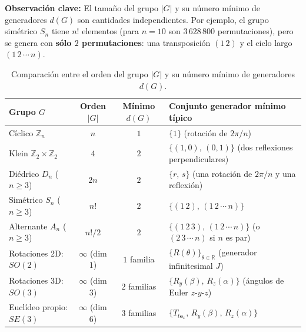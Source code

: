 \documentclass[11pt,letterpaper]{article}
\begin{document}
\textbf{Observación clave:} El tamaño del grupo $|G|$ y su número mínimo de generadores $d(G)$ son cantidades independientes. Por ejemplo, el grupo simétrico $S_n$ tiene $n!$ elementos (para $n=10$ son $3\,628\,800$ permutaciones), pero se genera con \textbf{sólo $2$ permutaciones}: una transposición $(1\,2)$ y el ciclo largo $(1\,2\,\cdots\,n)$.

\begin{table}[htbp]
\centering
\renewcommand{\arraystretch}{1.35}
\begin{tabular}{@{}lccl@{}}
  \toprule
  \textbf{Grupo $G$} & \textbf{Orden $|G|$} & \textbf{Mínimo $d(G)$} & \textbf{Conjunto generador mínimo típico} \\
  \midrule
  Cíclico $\mathbb{Z}_n$ & $n$ & $1$ & $\{1\}$ (rotación de $2\pi/n$) \\
  Klein $\mathbb{Z}_2\times\mathbb{Z}_2$ & $4$ & $2$ & $\{(1,0),\,(0,1)\}$ (dos reflexiones perpendiculares) \\
  Diédrico $D_n$ ($n\ge 3$) & $2n$ & $2$ & $\{r,\,s\}$ (una rotación de $2\pi/n$ y una reflexión) \\
  Simétrico $S_n$ ($n\ge 3$) & $n!$ & $2$ & $\{(1\,2),\,(1\,2\,\cdots\,n)\}$ \\
  Alternante $A_n$ ($n\ge 3$) & $n!/2$ & $2$ & $\{(1\,2\,3),\,(1\,2\,\cdots\,n)\}$ (o $(2\,3\,\cdots\,n)$ si $n$ es par) \\
  \midrule
  Rotaciones 2D: $SO(2)$ & $\infty$ (dim $1$) & $1$ familia & $\{R(\theta)\}_{\theta\in\mathbb{R}}$ \quad (generador infinitesimal $J$) \\
  Rotaciones 3D: $SO(3)$ & $\infty$ (dim $3$) & $2$ familias & $\{R_y(\beta),\,R_z(\alpha)\}$ \quad (ángulos de Euler $z$-$y$-$z$) \\
  Euclídeo propio: $SE(3)$ & $\infty$ (dim $6$) & $3$ familias & $\{T_{t\mathbf{e}_x},\,R_y(\beta),\,R_z(\alpha)\}$ \\
  \bottomrule
\end{tabular}
\caption{Comparación entre el orden del grupo $|G|$ y su número mínimo de generadores $d(G)$.}
\label{tab:generadores}
\end{table}
\FloatBarrier
\end{document}
